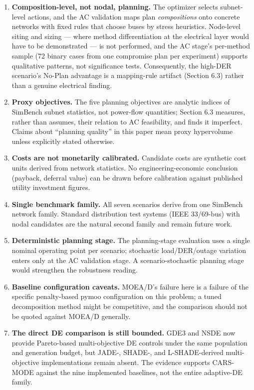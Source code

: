 \documentclass[
  10pt,
  a4paper,
]{article}
\providecommand{\tightlist}{%
  \setlength{\itemsep}{0pt}\setlength{\parskip}{0pt}}
\begin{document}
\begin{enumerate}
\def\labelenumi{\arabic{enumi}.}
\tightlist
\item
  \textbf{Composition-level, not nodal, planning.} The optimizer selects
  subnet-level actions, and the AC validation maps plan
  \emph{compositions} onto concrete networks with fixed rules that
  choose buses by stress heuristics. Node-level siting and sizing ---
  where method differentiation at the electrical layer would have to be
  demonstrated --- is not performed, and the AC stage's per-method
  sample (72 binary cases from one compromise plan per experiment)
  supports qualitative patterns, not significance tests. Consequently,
  the high-DER scenario's No-Plan advantage is a mapping-rule artifact
  (Section 6.3) rather than a genuine electrical finding.
\item
  \textbf{Proxy objectives.} The five planning objectives are analytic
  indices of SimBench subnet statistics, not power-flow quantities;
  Section 6.3 measures, rather than assumes, their relation to AC
  feasibility, and finds it imperfect. Claims about ``planning quality''
  in this paper mean proxy hypervolume unless explicitly stated
  otherwise.
\item
  \textbf{Costs are not monetarily calibrated.} Candidate costs are
  synthetic cost units derived from network statistics. No
  engineering-economic conclusion (payback, deferral value) can be drawn
  before calibration against published utility investment figures.
\item
  \textbf{Single benchmark family.} All seven scenarios derive from one
  SimBench network family. Standard distribution test systems (IEEE
  33/69-bus) with nodal candidates are the natural second family and
  remain future work.
\item
  \textbf{Deterministic planning stage.} The planning-stage evaluation
  uses a single nominal operating point per scenario; stochastic
  load/DER/outage variation enters only at the AC validation stage. A
  scenario-stochastic planning stage would strengthen the robustness
  reading.
\item
  \textbf{Baseline configuration caveats.} MOEA/D's failure here is a
  failure of the specific penalty-based pymoo configuration on this
  problem; a tuned decomposition method might be competitive, and the
  comparison should not be quoted against MOEA/D generally.
\item
  \textbf{The direct DE comparison is still bounded.} GDE3 and NSDE now
  provide Pareto-based multi-objective DE controls under the same
  population and generation budget, but JADE-, SHADE-, and
  L-SHADE-derived multi-objective implementations remain absent. The
  evidence supports CARS-MODE against the nine implemented baselines,
  not the entire adaptive-DE family.
\end{enumerate}
\end{document}
